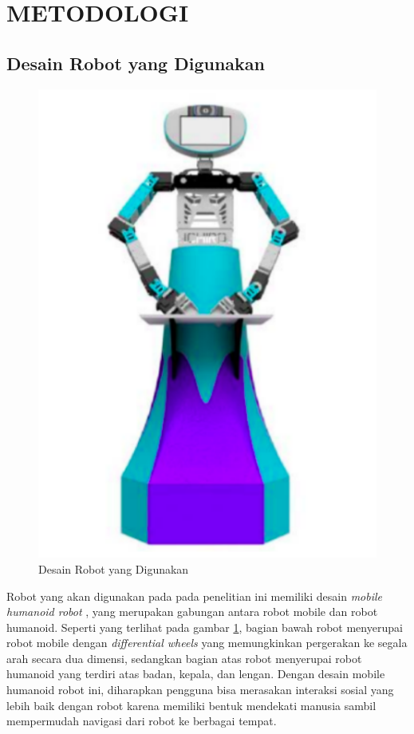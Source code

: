 \section{METODOLOGI}

\subsection{Desain Robot yang Digunakan}

\begin{figure} [ht] \centering
	\includegraphics[scale=0.45]{gambar/robot-design.png}
	\caption{Desain Robot yang Digunakan}
	\label{fig:RobotDesign}
\end{figure}

Robot yang akan digunakan pada pada penelitian ini memiliki desain \emph{mobile humanoid robot} \citep{Mohamed2012}, yang merupakan gabungan antara robot mobile dan robot humanoid.
Seperti yang terlihat pada gambar \ref{fig:RobotDesign}, bagian bawah robot menyerupai robot mobile dengan \emph{differential wheels} yang memungkinkan pergerakan ke segala arah secara dua dimensi, sedangkan bagian atas robot menyerupai robot humanoid yang terdiri atas badan, kepala, dan lengan.
Dengan desain mobile humanoid robot ini, diharapkan pengguna bisa merasakan interaksi sosial yang lebih baik dengan robot karena memiliki bentuk mendekati manusia \citep{Rossi2018} sambil mempermudah navigasi dari robot ke berbagai tempat.

